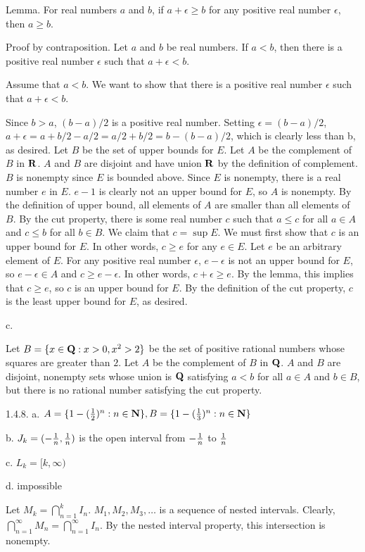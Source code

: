 Lemma. For real numbers $a$ and $b$,
if $a + \epsilon \ge b$ for any positive real number $\epsilon$,
then $a \ge b$.

Proof by contraposition.
Let $a$ and $b$ be real numbers.
If $a < b$, then there is a positive real number $\epsilon$
such that $a + \epsilon < b$.

Assume that $a < b$.
We want to show that there is a positive real number $\epsilon$
such that $a + \epsilon < b$.

Since $b > a$, $(b - a) / 2$ is a positive real number.
Setting $\epsilon = (b - a) / 2$,
$a + \epsilon = a + b/2 - a/2 = a/2 + b/2 = b - (b - a)/2$,
which is clearly less than b, as desired.
\medskip
Let $B$ be the set of upper bounds for $E$.
Let $A$ be the complement of $B$ in $\real$.
$A$ and $B$ are disjoint and have union $\real$
by the definition of complement.
$B$ is nonempty since $E$ is bounded above.
Since $E$ is nonempty, there is a real number $e$ in $E$.
$e - 1$ is clearly not an upper bound for $E$, so $A$ is nonempty.
By the definition of upper bound,
all elements of $A$ are smaller than all elements of $B$.
By the cut property, there is some real number $c$ such that
$a \le c$ for all $a \in A$ and $c \le b$ for all $b \in B$.
We claim that $c = \sup E$.
We must first show that $c$ is an upper bound for $E$.
In other words, $c \ge e$ for any $e \in E$.
Let $e$ be an arbitrary element of $E$.
For any positive real number $\epsilon$,
$e - \epsilon$ is not an upper bound for $E$,
so $e - \epsilon \in A$ and $c \ge e - \epsilon$.
In other words, $c + \epsilon \ge e$.
By the lemma, this implies that $c \ge e$,
so $c$ is an upper bound for $E$.
By the definition of the cut property,
$c$ is the least upper bound for $E$, as desired.
\medskip
\item{} c.

Let $B = \{x \in \rational : x > 0, x^2 > 2\}$
be the set of positive rational numbers whose squares are greater than $2$.
Let $A$ be the complement of $B$ in $\rational$.
$A$ and $B$ are disjoint, nonempty sets whose union is $\rational$
satisfying $a < b$ for all $a \in A$ and $b \in B$,
but there is no rational number satisfying the cut property.
\bigskip
\item{1.4.8.} a.
$A = \{1 - ({1 \over 2})^n : n \in \natural\},
B = \{1 - ({1 \over 3})^n : n \in \natural\}$
\medskip
\item{} b.
$J_k = (-{1 \over n}, {1 \over n})$
is the open interval from $-{1 \over n}$ to $1 \over n$
\medskip
\item{} c.
$L_k = [k, \infty)$
\medskip
\item{} d.
impossible

Let $M_k = \bigcap_{n=1}^k I_n$.
$M_1, M_2, M_3, \ldots$ is a sequence of nested intervals.
Clearly, $\bigcap_{n=1}^\infty M_n = \bigcap_{n=1}^\infty I_n$.
By the nested interval property, this intersection is nonempty.
\bye
